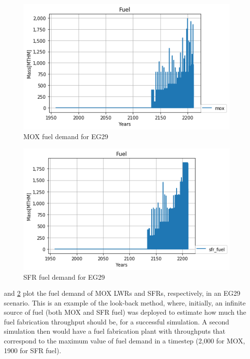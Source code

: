 \documentclass{article}
\begin{document}
\begin{figure}[htbp!]
	\begin{center}
		\includegraphics[scale=0.6]{./images/mox_fuel.png}
	\end{center}
	\caption{\gls{MOX} fuel demand for EG29}
	\label{fig:mox}
\end{figure}
\begin{figure}[htbp!]
	\begin{center}
		\includegraphics[scale=0.6]{./images/sfr_fuel.png}
	\end{center}
	\caption{\gls{SFR} fuel demand for EG29}
	\label{fig:sfr}
\end{figure}
\FloatBarrier

 and \cref{fig:sfr} plot the fuel demand of \gls{MOX} \glspl{LWR} and \glspl{SFR},
respectively, in an EG29 scenario. This is an example of the look-back method, where, initially, an infinite source
of fuel (both \gls{MOX} and \gls{SFR} fuel) was deployed to estimate how much the fuel fabrication
throughput should be, for a successful simulation. A second simulation then would have a 
fuel fabrication plant with throughputs that correspond to the maximum value of fuel demand in a timestep
(2,000 for \gls{MOX}, 1900 for \gls{SFR} fuel).
\end{document}
